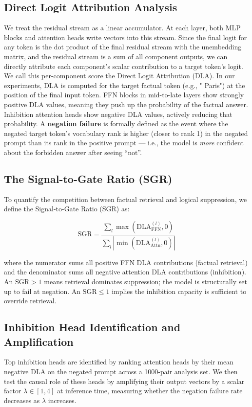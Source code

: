 \documentclass[11pt]{article}
\begin{document}
\subsection{Direct Logit Attribution Analysis}
We treat the residual stream as a linear accumulator. At each layer, both MLP blocks and attention heads write vectors into this stream. Since the final logit for any token is the dot product of the final residual stream with the unembedding matrix, and the residual stream is a sum of all component outputs, we can directly attribute each component's scalar contribution to a target token's logit. We call this per-component score the Direct Logit Attribution (DLA). In our experiments, DLA is computed for the target factual token (e.g., " Paris") at the position of the final input token. FFN blocks in mid-to-late layers show strongly positive DLA values, meaning they push up the probability of the factual answer. Inhibition attention heads show negative DLA values, actively reducing that probability. A \textbf{negation failure} is formally defined as the event where the negated target token's vocabulary rank is higher (closer to rank 1) in the negated prompt than its rank in the positive prompt — i.e., the model is \emph{more} confident about the forbidden answer after seeing ``not''.

\subsection{The Signal-to-Gate Ratio (SGR)}
To quantify the competition between factual retrieval and logical suppression, we define the Signal-to-Gate Ratio (SGR) as:

\begin{equation}
\text{SGR} = \frac{\sum_{l} \max(\text{DLA}^{(l)}_{\text{FFN}}, 0)}{\sum_{l} |\min(\text{DLA}^{(l)}_{\text{Attn}}, 0)|}
\end{equation}

where the numerator sums all positive FFN DLA contributions (factual retrieval) and the denominator sums all negative attention DLA contributions (inhibition). An $\text{SGR} > 1$ means retrieval dominates suppression; the model is structurally set up to fail at negation. An $\text{SGR} \leq 1$ implies the inhibition capacity is sufficient to override retrieval.

\subsection{Inhibition Head Identification and Amplification}
Top inhibition heads are identified by ranking attention heads by their mean negative DLA on the negated prompt across a 1000-pair analysis set. We then test the causal role of these heads by amplifying their output vectors by a scalar factor $\lambda \in [1, 4]$ at inference time, measuring whether the negation failure rate decreases as $\lambda$ increases.
\end{document}
